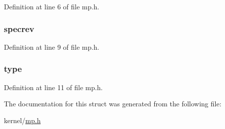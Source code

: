 Definition at line 6 of file mp.\-h.

\hypertarget{structmp_a3241a69299a13c78c22ccfe7ec22e90d}{
\subsubsection[{specrev}]{ specrev}}\label{structmp_a3241a69299a13c78c22ccfe7ec22e90d}


Definition at line 9 of file mp.\-h.

\hypertarget{structmp_a7720cfa5e476235d84bbe5bb8ad56959}{
\subsubsection[{type}]{ type}}\label{structmp_a7720cfa5e476235d84bbe5bb8ad56959}


Definition at line 11 of file mp.\-h.



The documentation for this struct was generated from the following file\-:\begin{DoxyCompactItemize}
\item 
kernel/\hyperlink{mp_8h}{mp.\-h}\end{DoxyCompactItemize}
